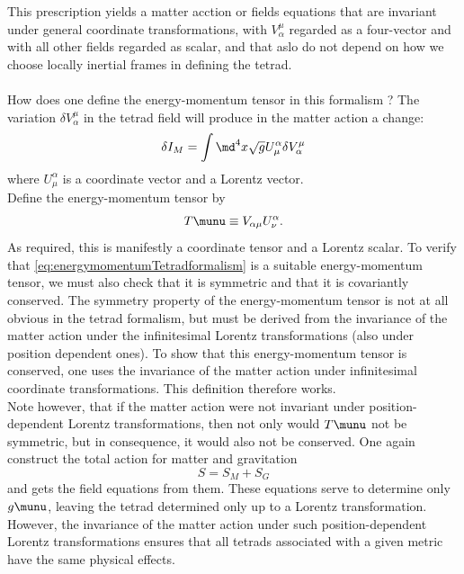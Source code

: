 This prescription yields a matter acction or fields equations that are invariant under general coordinate transformations, with $V^\mu_\alpha$ regarded as a four-vector and with all other fields regarded as scalar, and that aslo do not depend on how we choose locally inertial frames in defining the tetrad.\\
\\
How does one define the energy-momentum tensor in this formalism ?
The variation $\delta V^\mu_\alpha$ in the tetrad field will produce in the matter action a change:
\begin{equation}
	\delta I_M = \int \md^4 x \sqrt{g} U^\alpha_\mu \delta V^\mu_\alpha
\end{equation}
where $U^\alpha_\mu$ is a coordinate vector and a Lorentz vector.
\\
Define the energy-momentum tensor by
\begin{equation}
\label{eq:energymomentumTetradformalism}
T\munu \equiv V_{\alpha \mu} U^\alpha_\nu.
\end{equation}
As required, this is manifestly a coordinate tensor and a Lorentz scalar. To verify that \ref{eq:energymomentumTetradformalism} is a suitable energy-momentum tensor, we must also check that it is symmetric and that it is covariantly conserved. The symmetry property of the energy-momentum tensor is not at all obvious in the tetrad formalism, but must be derived from the invariance of the matter action under the infinitesimal Lorentz transformations (also under position dependent ones). To show that this energy-momentum tensor is conserved, one uses the invariance of the matter action under infinitesimal coordinate transformations. This definition therefore works.\\
Note however, that if the matter action were not invariant under position-dependent Lorentz transformations, then not only would $T\munu$ not be symmetric, but in consequence, it would also not be conserved. One again construct the total action for matter and gravitation 
\begin{equation}
	S=S_M+S_G
\end{equation}
and gets the field equations from them. These equations serve to determine only $g\munu$, leaving the tetrad determined only up to a Lorentz transformation. However, the invariance of the matter action under such position-dependent Lorentz transformations ensures that all tetrads associated with a given metric have the same physical effects.

